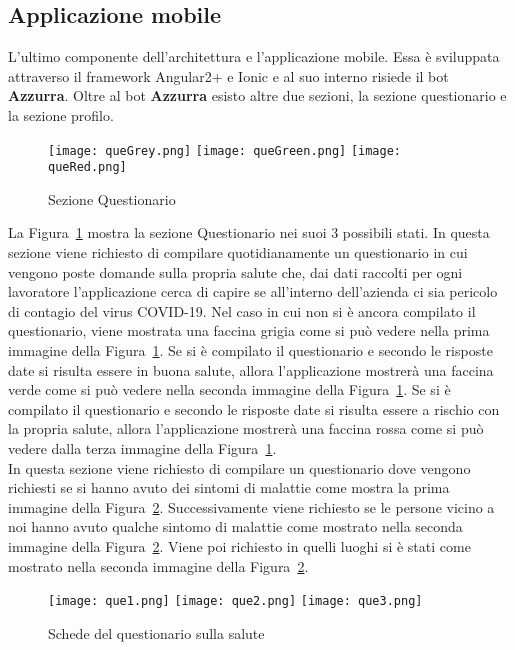 \begin{trivlist}
	\item\subsection{Applicazione mobile}
	L'ultimo componente dell'architettura e l'applicazione mobile. Essa è sviluppata attraverso il framework Angular2+ e Ionic e al suo interno risiede il bot \textbf{Azzurra}. Oltre al bot \textbf{Azzurra} esisto altre due sezioni, la sezione questionario e la sezione profilo. 
	
	\begin{figure}[h]
		\centering
		\texttt{[image: queGrey.png]}\hfill
		\texttt{[image: queGreen.png]}\hfill
		\texttt{[image: queRed.png]}
		\caption{Sezione Questionario}\label{fig:que}
	\end{figure}
	
	La Figura~\ref{fig:que} mostra la sezione Questionario nei suoi 3 possibili stati. In questa sezione viene richiesto di compilare quotidianamente un questionario in cui vengono poste domande sulla propria salute che, dai dati raccolti per ogni lavoratore l'applicazione cerca di capire se all'interno dell'azienda ci sia pericolo di contagio del virus COVID-19. Nel caso in cui non si è ancora compilato il questionario, viene mostrata una faccina grigia come si può vedere nella prima immagine della Figura~\ref{fig:que}. Se si è compilato il questionario e secondo le risposte date si risulta essere in buona salute, allora l'applicazione mostrerà una faccina verde come si può vedere nella seconda immagine della Figura~\ref{fig:que}. Se si è compilato il questionario e secondo le risposte date si risulta essere a rischio con la propria salute, allora l'applicazione mostrerà una faccina rossa come si può vedere dalla terza immagine della Figura~\ref{fig:que}.
	\\
	\clearpage
	In questa sezione viene richiesto di compilare un questionario dove vengono richiesti se si hanno avuto dei sintomi di malattie come mostra la prima immagine della Figura~\ref{fig:queSlide}. Successivamente viene richiesto se le persone vicino a noi hanno avuto qualche sintomo di malattie come mostrato nella seconda immagine della Figura~\ref{fig:queSlide}. Viene poi richiesto in quelli luoghi si è stati come mostrato nella seconda immagine della Figura~\ref{fig:queSlide}.
	\begin{figure}[h]
		\begin{center}
			\texttt{[image: que1.png]}
			\texttt{[image: que2.png]}
			\texttt{[image: que3.png]}
			\caption{Schede del questionario sulla salute}\label{fig:queSlide}
		\end{center}
	\end{figure}


\end{trivlist}
